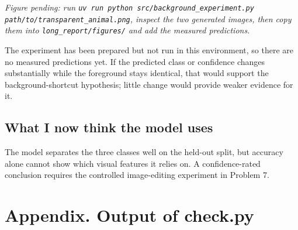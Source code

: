 \documentclass[11pt]{article}
\begin{document}
\textit{Figure pending: run \texttt{uv run python src/background\_experiment.py path/to/transparent\_animal.png}, inspect the two generated images, then copy them into \texttt{long\_report/figures/} and add the measured predictions.}

The experiment has been prepared but not run in this environment, so there are no measured predictions yet. If the predicted class or confidence changes substantially while the foreground stays identical, that would support the background-shortcut hypothesis; little change would provide weaker evidence for it.

\subsection*{What I now think the model uses}
The model separates the three classes well on the held-out split, but accuracy alone cannot show which visual features it relies on. A confidence-rated conclusion requires the controlled image-editing experiment in Problem 7.

\section*{Appendix. Output of check.py}
\end{document}
